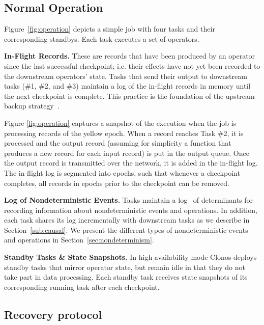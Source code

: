 \documentclass[sigconf]{acmart}
\newcommand{\para}[1]{\vspace{1mm}\noindent\textbf{#1.}}
\begin{document}
\subsection{Normal Operation}
\label{sub:protocol-actions-op}

Figure~\ref{fig:operation} depicts a simple job with four tasks and their corresponding standbys. Each task executes a set of operators.

\para{In-Flight Records}
These are records that have been produced by an operator since the last successful checkpoint;
i.e. their effects have not yet been recorded to the downstream operators' state.
Tasks that send their output to downstream tasks (\#1, \#2, and \#3) maintain a log of the in-flight records in memory until the next checkpoint is
complete.
This practice is the foundation of the upstream backup strategy~\cite{Hwang2005HAA}.

Figure \ref{fig:operation} captures a snapshot of the execution when the job is processing records of the yellow epoch. 
When a record reaches Task \#2, it is processed and the output record (assuming for simplicity a function that produces a new record for each input record) is put in the output queue. Once the output record is transmitted over the network, it is added in the in-flight log.
The in-flight log is segmented into epochs, such that whenever a checkpoint completes, all records in epochs prior to the checkpoint can be removed. %

\para{Log of Nondeterministic Events}
Tasks maintain a log~\cite{elnozahy1992manetho} of determinants for recording information about nondeterministic events and operations.
In addition, each task shares its log incrementally with downstream tasks as we describe in Section~\ref{sub:causal}.
We present the different types of nondeterministic events and operations in Section~\ref{sec:nondeterminism}.

\para{Standby Tasks \& State Snapshots}
In high availability mode Clonos deploys standby tasks that mirror operator state, but remain idle in that they do not take part in data processing.
Each standby task receives state snapshots of its corresponding running task after each checkpoint.

\subsection{Recovery protocol}
\label{sub:protocol-actions-recovery}
\end{document}
